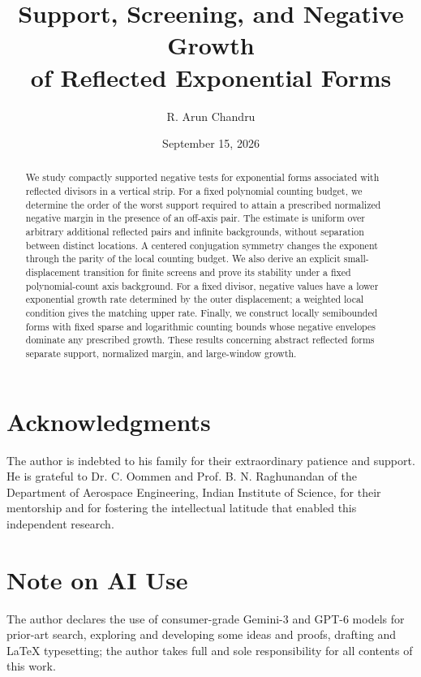 \documentclass[11pt]{amsart}
\title[Support, screening, and negative growth]{Support, Screening, and Negative Growth\\of Reflected Exponential Forms}
\author{R. Arun Chandru}
\date{September 15, 2026}
\numberwithin{equation}{section}
\begin{document}
\begin{abstract}
We study compactly supported negative tests for exponential forms
associated with reflected divisors in a vertical strip. For a fixed
polynomial counting budget, we determine the order of the worst support
required to attain a prescribed normalized negative margin in the
presence of an off-axis pair. The estimate is uniform over arbitrary
additional reflected pairs and infinite backgrounds, without separation
between distinct locations. A centered conjugation symmetry changes
the exponent through the parity of the local counting budget. We also
derive an explicit small-displacement transition for finite screens
and prove its stability under a fixed polynomial-count axis background.
For a fixed divisor, negative values have a lower exponential growth
rate determined by the outer displacement; a weighted local condition
gives the matching upper rate. Finally, we construct locally
semibounded forms with fixed sparse and logarithmic counting bounds
whose negative envelopes dominate any prescribed growth. These
results concerning abstract reflected forms separate support, normalized margin, and large-window growth.
\end{abstract}
\maketitle
\tableofcontents








\section*{Acknowledgments}
The author is indebted to his family for their extraordinary patience and support. He is grateful to Dr. C. Oommen and Prof. B. N. Raghunandan of the Department of Aerospace Engineering, Indian Institute of Science, for their mentorship and for fostering the intellectual latitude that enabled this independent research.

\section*{Note on AI Use}
The author declares the use of consumer-grade Gemini-3 and GPT-6 models for prior-art search, exploring and developing some ideas and proofs, drafting and LaTeX typesetting; the author takes full and sole responsibility for all contents of this work.


\end{document}
